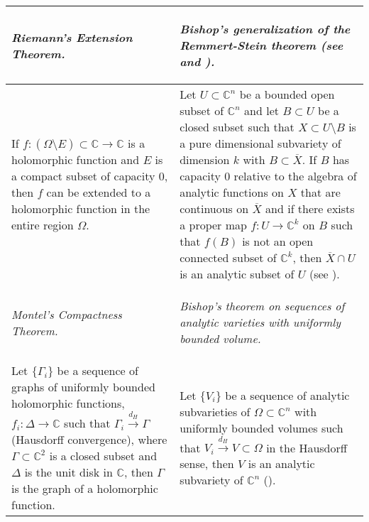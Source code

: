 \documentclass[12pt,twoside,a4paper]{report}
\newcommand{\co}{\ensuremath{\mathbb C }}
\newcommand{\con}{\ensuremath{\mathbb{C}^n}}
\begin{document}
\begin{table}[hpt]
\begin{tabular}{|m{5.5cm}|m{5.5cm}|}
                        \begin{center}
                        \textit{Riemann's Extension Theorem.}
                \end{center}
                        &
                \begin{center}
                        \textit{Bishop's generalization of the Remmert-Stein theorem (see \cite{R-S} and \cite[p. 34]{Stolzenberg}).}
                \end{center} \\
                        \hline If $f:(\Omega\setminus E)\subset\co\rightarrow\co$ is a holomorphic function and $E$ is a compact subset
                        of capacity $0$, then $f$ can be extended to a holomorphic function
                        in the entire region $\Omega$.
                        &
                        \vspace{0.1cm}
                        Let $U\subset\con$ be a bounded open subset of $\con$ and let $B\subset U$ be a closed subset
                        such that $X\subset U\setminus B$ is a pure dimensional subvariety of dimension $k$ with $B\subset\overline{X}$.
                        If $B$ has capacity $0$ relative to the algebra of analytic functions on $X$ that are
                        continuous on $\overline{X}$ and if there exists a proper map $f:U\rightarrow\co^k$ on $B$ such that $f(B)$
                        is not an open connected subset of $\co^k$, then $\overline{X}\cap U$ is an analytic subset
                        of $U$ (see \cite[Theorem 4]{Bishop}).\\
                        \hline
                \begin{center}
                        \textit{Montel's Compactness Theorem.}
                \end{center}
                        &
                \begin{center}
                        \textit{Bishop's theorem on sequences of analytic varieties with uniformly bounded volume.}
                \end{center}\\
                \hline
                \vspace{0.1cm}
                Let $\lbrace\Gamma_i\rbrace$ be a sequence of graphs of uniformly bounded holomorphic
                functions, $f_i:\Delta\rightarrow\co$ such that $\Gamma_i\overset{d_H}\longrightarrow\Gamma$ (Hausdorff convergence),
                where $\Gamma\subset\co^2$ is a closed subset and $\Delta$ is the unit disk in $\co$,
                then $\Gamma$ is the graph of a holomorphic function.
                        &
                Let $\lbrace V_i\rbrace$ be a sequence of analytic subvarieties of $\Omega\subset\con$ with uniformly
                bounded volumes such that $V_i\overset{d_H}\longrightarrow V\subset\Omega$ in the Hausdorff sense, then
                $V$ is an analytic subvariety of $\con$ (\cite[p. 30]{Stolzenberg}). \\ \hline
        \end{tabular}
\end{table}
\end{document}
